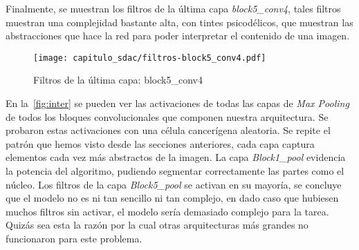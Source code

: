 Finalmente, se muestran los filtros de la última capa \emph{block5\_conv4},
tales filtros muestran una complejidad bastante alta, con tintes
psicodélicos, que muestran las abstracciones que hace la red para poder
interpretar el contenido de una imagen.

\begin{figure}[H] 
  \centering
  \texttt{[image: capitulo\_sdac/filtros-block5\_conv4.pdf]}
  \caption{Filtros de la última capa: block5\_conv4}\label{fig:convultima}
\end{figure}

En la~\autoref{fig:inter} se pueden ver las activaciones de todas las capas de
\emph{Max Pooling} de todos los bloques convolucionales que componen nuestra
arquitectura. Se probaron estas activaciones con una célula cancerígena
aleatoria. Se repite el patrón que hemos visto desde las secciones anteriores,
cada capa captura elementos cada vez más abstractos de la imagen. La capa
\emph{Block1\_pool} evidencia la potencia del algoritmo, pudiendo segmentar
correctamente las partes como el núcleo. Los filtros de la capa
\emph{Block5\_pool} se activan en su mayoría, se concluye que el modelo no es ni
tan sencillo ni tan complejo, en dado caso que hubiesen muchos filtros sin
activar, el modelo sería demasiado complejo para la tarea. Quizás sea esta la
razón por la cual otras arquitecturas más grandes no funcionaron para este
problema.

